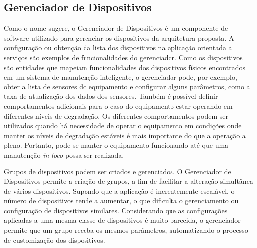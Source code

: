 %


\subsection{Gerenciador de Dispositivos}
\label{sub:proposta-gerenciador-dispositivos}

Como o nome sugere, o Gerenciador de Dispositivos é um componente de software utilizado para
gerenciar os dispositivos da arquitetura proposta. A configuração ou obtenção da lista dos
dispositivos na aplicação orientada a serviços são exemplos de funcionalidades do gerenciador. Como
os dispositivos são entidades que mapeiam funcionalidades dos dispositivos físicos encontrados em um
sistema de manutenção inteligente, o gerenciador pode, por exemplo, obter a lista de sensores do
equipamento e configurar alguns parâmetros, como a taxa de atualização dos dados dos sensores.
Também é possível definir comportamentos adicionais para o caso do equipamento estar operando em
diferentes níveis de degradação. Os diferentes comportamentos podem ser utilizados quando há
necessidade de operar o equipamento em condições onde manter os níveis de degradação estáveis é mais
importante do que a operação a pleno. Portanto, pode-se manter o equipamento funcionando até que uma
manutenção \textit{in loco} possa ser realizada.

Grupos de dispositivos podem ser criados e gerenciados. O Gerenciador de Dispositivos permite a
criação de grupos, a fim de facilitar a alteração simultânea de vários dispositivos. Supondo que a
aplicação é inerentemente escalável, o número de dispositivos tende a aumentar, o que dificulta o
gerenciamento ou configuração de dispositivos similares. Considerando que as configurações aplicadas
a uma mesma classe de dispositivos é muito parecida, o gerenciador permite que um grupo receba os
mesmos parâmetros, automatizando o processo de customização dos dispositivos.

